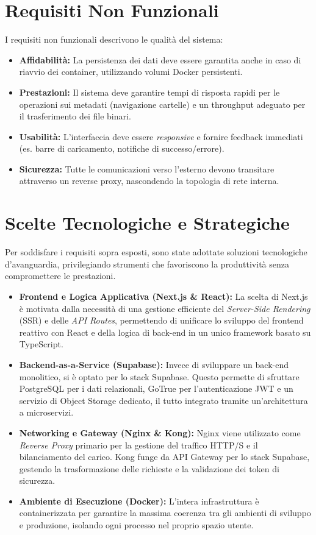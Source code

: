\documentclass[12pt,a4paper]{report}
\begin{document}
\section*{Requisiti Non Funzionali}
I requisiti non funzionali descrivono le qualità del sistema:
\begin{itemize}
  \item \textbf{Affidabilità:} La persistenza dei dati deve essere
    garantita anche in caso di riavvio dei container, utilizzando volumi
    Docker persistenti.
  \item \textbf{Prestazioni:} Il sistema deve garantire tempi di risposta
    rapidi per le operazioni sui metadati (navigazione cartelle) e un
    throughput adeguato per il trasferimento dei file binari.
  \item \textbf{Usabilità:} L'interfaccia deve essere \textit{responsive}
    e fornire feedback immediati (es. barre di caricamento, notifiche di
    successo/errore).
  \item \textbf{Sicurezza:} Tutte le comunicazioni verso l'esterno devono
    transitare attraverso un reverse proxy, nascondendo la topologia di
    rete interna.
\end{itemize}

\section{Scelte Tecnologiche e Strategiche}
Per soddisfare i requisiti sopra esposti, sono state adottate soluzioni
tecnologiche d'avanguardia, privilegiando strumenti che favoriscono la
produttività senza compromettere le prestazioni.

\begin{itemize}
  \item \textbf{Frontend e Logica Applicativa (Next.js \& React):} La
    scelta di Next.js è motivata dalla necessità di una gestione
    efficiente del \textit{Server-Side Rendering} (SSR) e delle
    \textit{API Routes}, permettendo di unificare lo sviluppo del frontend
    reattivo con React e della logica di back-end in un unico framework
    basato su TypeScript.
  \item \textbf{Backend-as-a-Service (Supabase):} Invece di sviluppare
    un back-end monolitico, si è optato per lo stack Supabase. Questo
    permette di sfruttare PostgreSQL per i dati relazionali, GoTrue per
    l'autenticazione JWT e un servizio di Object Storage dedicato, il
    tutto integrato tramite un'architettura a microservizi.
  \item \textbf{Networking e Gateway (Nginx \& Kong):} Nginx viene
    utilizzato come \textit{Reverse Proxy} primario per la gestione del
    traffico HTTP/S e il bilanciamento del carico. Kong funge da API
    Gateway per lo stack Supabase, gestendo la trasformazione delle
    richieste e la validazione dei token di sicurezza.
  \item \textbf{Ambiente di Esecuzione (Docker):} L'intera
    infrastruttura è containerizzata per garantire la massima coerenza tra
    gli ambienti di sviluppo e produzione, isolando ogni processo nel
    proprio spazio utente.
\end{itemize}
\end{document}
